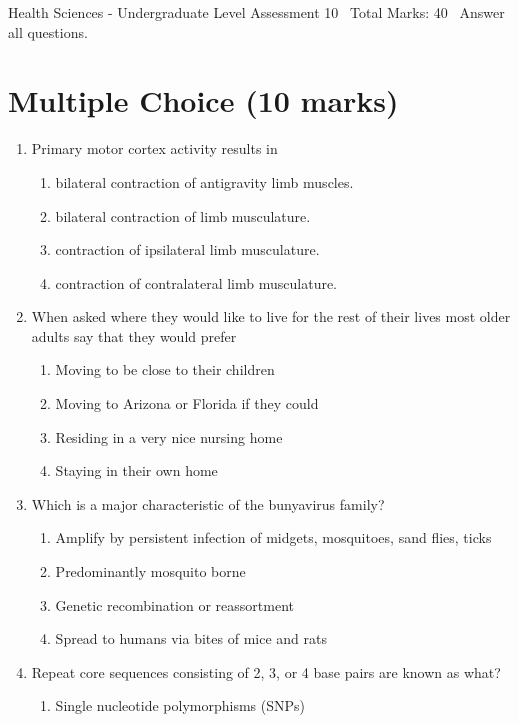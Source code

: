 \documentclass[12pt]{article}
\begin{document}
\begin{center}
Health Sciences - Undergraduate Level Assessment 10 \
Total Marks: 40 \
Answer all questions.
\end{center}

\section*{Multiple Choice (10 marks)}
\begin{enumerate}[label=\arabic*.]
\item Primary motor cortex activity results in
\begin{enumerate}[label=(\alph*)]
    \item bilateral contraction of antigravity limb muscles.
    \item bilateral contraction of limb musculature.
    \item contraction of ipsilateral limb musculature.
    \item contraction of contralateral limb musculature.
\end{enumerate}
\item When asked where they would like to live for the rest of their lives most older adults say that they would prefer
\begin{enumerate}[label=(\alph*)]
    \item Moving to be close to their children
    \item Moving to Arizona or Florida if they could
    \item Residing in a very nice nursing home
    \item Staying in their own home
\end{enumerate}
\item Which is a major characteristic of the bunyavirus family?
\begin{enumerate}[label=(\alph*)]
    \item Amplify by persistent infection of midgets, mosquitoes, sand flies, ticks
    \item Predominantly mosquito borne
    \item Genetic recombination or reassortment
    \item Spread to humans via bites of mice and rats
\end{enumerate}
\item Repeat core sequences consisting of 2, 3, or 4 base pairs are known as what?
\begin{enumerate}[label=(\alph*)]
    \item Single nucleotide polymorphisms (SNPs)

\end{enumerate}
\end{enumerate}
\end{document}
